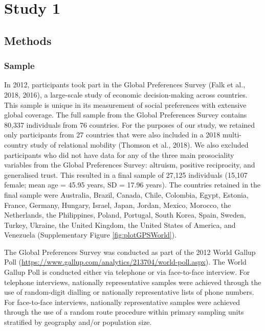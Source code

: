 \documentclass[
  man,floatsintext]{apa6}
\begin{document}
\hypertarget{study-1}{%
\section{Study 1}\label{study-1}}

\hypertarget{methods}{%
\subsection{Methods}\label{methods}}

\hypertarget{sample}{%
\subsubsection{Sample}\label{sample}}

In 2012, participants took part in the Global Preferences Survey (Falk et al., 2018, 2016), a large-scale study of economic decision-making across countries. This sample is unique in its measurement of social preferences with extensive global coverage. The full sample from the Global Preferences Survey contains 80,337 individuals from 76 countries. For the purposes of our study, we retained only participants from 27 countries that were also included in a 2018 multi-country study of relational mobility (Thomson et al., 2018). We also excluded participants who did not have data for any of the three main prosociality variables from the Global Preferences Survey: altruism, positive reciprocity, and generalised trust. This resulted in a final sample of 27,125 individuals (15,107 female; mean age = 45.95 years, SD = 17.96 years). The countries retained in the final sample were Australia, Brazil, Canada, Chile, Colombia, Egypt, Estonia, France, Germany, Hungary, Israel, Japan, Jordan, Mexico, Morocco, the Netherlands, the Philippines, Poland, Portugal, South Korea, Spain, Sweden, Turkey, Ukraine, the United Kingdom, the United States of America, and Venezuela (Supplementary Figure \ref{fig:plotGPSWorld}).

The Global Preferences Survey was conducted as part of the 2012 World Gallup Poll (\url{https://www.gallup.com/analytics/213704/world-poll.aspx}). The World Gallup Poll is conducted either via telephone or via face-to-face interview. For telephone interviews, nationally representative samples were achieved through the use of random-digit dialling or nationally representative lists of phone numbers. For face-to-face interviews, nationally representative samples were achieved through the use of a random route procedure within primary sampling units stratified by geography and/or population size.
\end{document}
